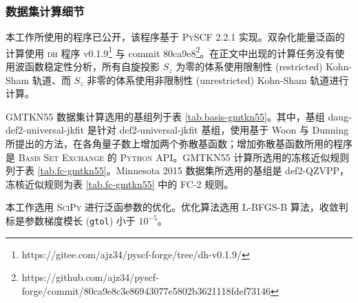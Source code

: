 \subsubsection{数据集计算细节}

本工作所使用的程序已公开\cite{dh.ajz34}，该程序基于 \textsc{PySCF} 2.2.1 实现\cite{Sun-Chan.WCMS.2018, Sun-Chan.JCP.2020}。双杂化能量泛函的计算使用 \textsc{dh} 程序 v0.1.9\footnote{https://gitee.com/ajz34/pyscf-forge/tree/dh-v0.1.9/} 与 commit 80ca9e8\footnote{https://github.com/ajz34/pyscf-forge/commit/80ca9e8c3e86943077e5802b3621118fdef73146}。在正文中出现的计算任务没有使用波函数稳定性分析，所有自旋投影 $S_z$ 为零的体系使用限制性 (restricted) Kohn-Sham 轨道、而 $S_z$ 非零的体系使用非限制性 (unrestricted) Kohn-Sham 轨道进行计算。

GMTKN55 数据集计算选用的基组列于表 \ref{tab.basis-gmtkn55}。其中，基组 daug-def2-universal-jkfit 是针对 def2-universal-jkfit 基组，使用基于 Woon 与 Dunning 所提出的方法\cite{Woon-Dunning.JCP.1994}，在各角量子数上增加两个弥散基函数；增加弥散基函数所用的程序是 \textsc{Basis Set Exchange} 的 \textsc{Python} API\cite{Feller-Feller.JCC.1996, Schuchardt-Windus.JCIM.2007, Pritchard-Windus.JCIM.2019}。GMTKN55 计算所选用的冻核近似规则列于表 \ref{tab.fc-gmtkn55}。Minnesota 2015 数据集所选用的基组是 def2-QZVPP\cite{10.1007/BF01112983, 10.1007/BF00528565, 10.1063/1.1622924, 10.1063/1.1305880, 10.1007/s002149900101, 10.1016/0009-2614(96)00382-x, 10.1063/1.459993, 10.1007/bf01114537, 10.1039/b508541a, 10.1063/1.1406535, 10.1063/1.456066, 10.1021/ct300302u, 10.1063/1.1627293}，冻核近似规则为表 \ref{tab.fc-gmtkn55} 中的 FC-2 规则。

本工作选用 \textsc{SciPy}\cite{Virtanen-Vazquez-Baeza.NM.2020} 进行泛函参数的优化。优化算法选用 L-BFGS-B 算法\cite{Byrd-Zhu.SJSC.1995}，收敛判标是参数梯度模长 (\verb|gtol|) 小于 $10^{-5}$。

